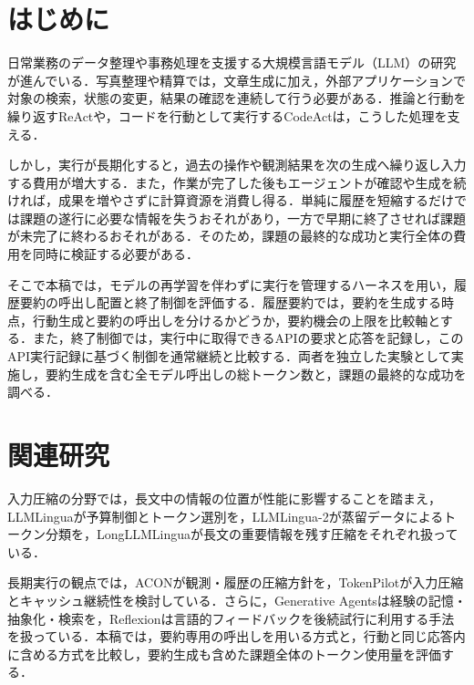\documentclass[letter]{ieicej}
\begin{document}
\maketitle



\section{はじめに}

日常業務のデータ整理や事務処理を支援する大規模言語モデル（LLM）の研究が進んでいる．写真整理や精算では，文章生成に加え，外部アプリケーションで対象の検索，状態の変更，結果の確認を連続して行う必要がある．推論と行動を繰り返すReAct\cite{yao2023react}や，コードを行動として実行するCodeAct\cite{wang2024codeact}は，こうした処理を支える．

しかし，実行が長期化すると，過去の操作や観測結果を次の生成へ繰り返し入力する費用が増大する．また，作業が完了した後もエージェントが確認や生成を続ければ，成果を増やさずに計算資源を消費し得る．単純に履歴を短縮するだけでは課題の遂行に必要な情報を失うおそれがあり，一方で早期に終了させれば課題が未完了に終わるおそれがある．そのため，課題の最終的な成功と実行全体の費用を同時に検証する必要がある．

そこで本稿では，モデルの再学習を伴わずに実行を管理するハーネスを用い，履歴要約の呼出し配置と終了制御を評価する．履歴要約では，要約を生成する時点，行動生成と要約の呼出しを分けるかどうか，要約機会の上限を比較軸とする．また，終了制御では，実行中に取得できるAPIの要求と応答を記録し，このAPI実行記録に基づく制御を通常継続と比較する．両者を独立した実験として実施し，要約生成を含む全モデル呼出しの総トークン数と，課題の最終的な成功を調べる．

\par\noindent\begin{minipage}{\columnwidth}
\section{関連研究}

入力圧縮の分野では，長文中の情報の位置が性能に影響すること\cite{liu2024lost}を踏まえ，LLMLingua\cite{jiang2023llmlingua}が予算制御とトークン選別を，LLMLingua-2\cite{pan2024llmlingua2}が蒸留データによるトークン分類を，LongLLMLingua\cite{jiang2024longllmlingua}が長文の重要情報を残す圧縮をそれぞれ扱っている．

\end{minipage}\par{}

長期実行の観点では，ACON\cite{kang2026acon}が観測・履歴の圧縮方針を，TokenPilot\cite{xu2026tokenpilot}が入力圧縮とキャッシュ継続性を検討している．さらに，Generative Agents\cite{park2023generative}は経験の記憶・抽象化・検索を，Reflexion\cite{shinn2023reflexion}は言語的フィードバックを後続試行に利用する手法を扱っている．本稿では，要約専用の呼出しを用いる方式と，行動と同じ応答内に含める方式を比較し，要約生成も含めた課題全体のトークン使用量を評価する．
\end{document}
